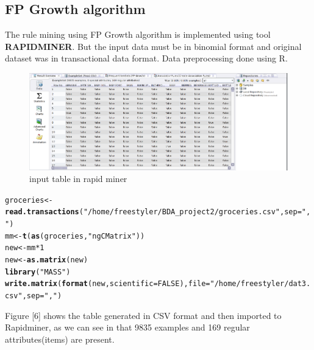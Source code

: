 \documentclass{article}\usepackage[]{graphicx}\usepackage[]{color}
\makeatletter
\newcommand{\hlnum}[1]{\textcolor[rgb]{0.686,0.059,0.569}{#1}}%
\newcommand{\hlstr}[1]{\textcolor[rgb]{0.192,0.494,0.8}{#1}}%
\newcommand{\hlopt}[1]{\textcolor[rgb]{0,0,0}{#1}}%
\newcommand{\hlstd}[1]{\textcolor[rgb]{0.345,0.345,0.345}{#1}}%
\newcommand{\hlkwb}[1]{\textcolor[rgb]{0.69,0.353,0.396}{#1}}%
\newcommand{\hlkwc}[1]{\textcolor[rgb]{0.333,0.667,0.333}{#1}}%
\newcommand{\hlkwd}[1]{\textcolor[rgb]{0.737,0.353,0.396}{\textbf{#1}}}%
\newenvironment{kframe}{%
 \def\at@end@of@kframe{}%
 \ifinner\ifhmode%
  \def\at@end@of@kframe{\end{minipage}}%
  \begin{minipage}{\columnwidth}%
 \fi\fi%
 \def\FrameCommand##1{\hskip\@totalleftmargin \hskip-\fboxsep
 \colorbox{shadecolor}{##1}\hskip-\fboxsep
     \hskip-\linewidth \hskip-\@totalleftmargin \hskip\columnwidth}%
 \MakeFramed {\advance\hsize-\width
   \@totalleftmargin\z@ \linewidth\hsize
   \@setminipage}}%
 {\par\unskip\endMakeFramed%
 \at@end@of@kframe}
\newenvironment{knitrout}{}{} %
\makeatother
\begin{document}
\subsection{FP Growth algorithm}\hspace{0.5cm}The rule mining using FP Growth algorithm is implemented using tool \textbf{RAPIDMINER}. But the input data must be in binomial format and original dataset was in transactional data format. Data preprocessing done using R.\\
\begin{figure}[h]
\begin{center}
\includegraphics [scale=0.40]{data.png}
\end{center}
\caption{input table in rapid miner}
\end{figure}
\begin{knitrout}
\color{fgcolor}\begin{kframe}
\begin{alltt}
\hlstd{groceries} \hlkwb{<-} \hlkwd{read.transactions}\hlstd{(}\hlstr{"/home/freestyler/BDA_project2/groceries.csv"}\hlstd{,} \hlkwc{sep} \hlstd{=} \hlstr{","}\hlstd{)}
\hlstd{mm} \hlkwb{<-} \hlkwd{t}\hlstd{(}\hlkwd{as}\hlstd{(groceries,}\hlstr{"ngCMatrix"}\hlstd{))}
\hlstd{new}\hlkwb{<-} \hlstd{mm}\hlopt{*}\hlnum{1}
\hlstd{new}\hlkwb{<-} \hlkwd{as.matrix}\hlstd{(new)}
\hlkwd{library}\hlstd{(}\hlstr{"MASS"}\hlstd{)}
\hlkwd{write.matrix}\hlstd{(}\hlkwd{format}\hlstd{(new,} \hlkwc{scientific}\hlstd{=}\hlnum{FALSE}\hlstd{),}\hlkwc{file} \hlstd{=}\hlstr{"/home/freestyler/dat3.csv"}\hlstd{,} \hlkwc{sep}\hlstd{=}\hlstr{","}\hlstd{)}
\end{alltt}
\end{kframe}
\end{knitrout}
Figure [6] shows the table generated in CSV format and then imported to Rapidminer, as we can see in that 9835 examples and 169 regular attributes(items) are present.
\end{document}
